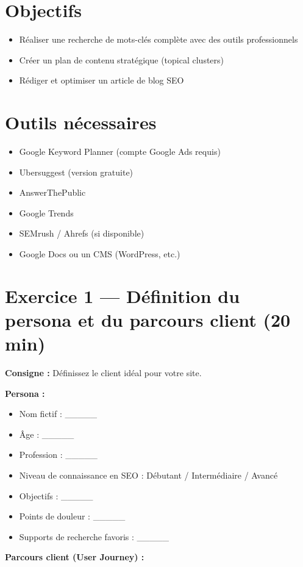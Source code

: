 \documentclass[12pt,a4paper]{report}
\begin{document}
\section{Objectifs}
\begin{itemize}
\item Réaliser une recherche de mots-clés complète avec des outils professionnels
\item Créer un plan de contenu stratégique (topical clusters)
\item Rédiger et optimiser un article de blog SEO
\end{itemize}

\section{Outils nécessaires}
\begin{itemize}
\item Google Keyword Planner (compte Google Ads requis)
\item Ubersuggest (version gratuite)
\item AnswerThePublic
\item Google Trends
\item SEMrush / Ahrefs (si disponible)
\item Google Docs ou un CMS (WordPress, etc.)
\end{itemize}

\section{Exercice 1 --- Définition du persona et du parcours client (20 min)}

\textbf{Consigne :} Définissez le client idéal pour votre site.

\textbf{Persona :}
\begin{itemize}
\item Nom fictif : \_\_\_\_\_
\item Âge : \_\_\_\_\_
\item Profession : \_\_\_\_\_
\item Niveau de connaissance en SEO : Débutant / Intermédiaire / Avancé
\item Objectifs : \_\_\_\_\_
\item Points de douleur : \_\_\_\_\_
\item Supports de recherche favoris : \_\_\_\_\_
\end{itemize}

\textbf{Parcours client (User Journey) :}
\end{document}
